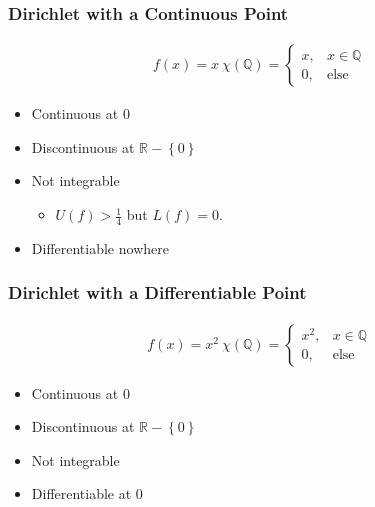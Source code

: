 \hypertarget{dirichlet-with-a-continuous-point}{%
\subsubsection{Dirichlet with a Continuous
Point}\label{dirichlet-with-a-continuous-point}}

\begin{align*}
f ( x ) = x~\chi({\mathbb{Q}}) = 
\begin{cases}
x, & x\in {\mathbb{Q}}\\
0, & \text{else}
\end{cases}
\end{align*}

\begin{itemize}
\tightlist
\item
  Continuous at 0
\item
  Discontinuous at \({\mathbb{R}}-\left\{{0}\right\}\)
\item
  Not integrable

  \begin{itemize}
  \tightlist
  \item
    \(U(f) > \frac 1 4\) but \(L(f) = 0\).
  \end{itemize}
\item
  Differentiable nowhere
\end{itemize}

\hypertarget{dirichlet-with-a-differentiable-point}{%
\subsubsection{Dirichlet with a Differentiable
Point}\label{dirichlet-with-a-differentiable-point}}

\begin{align*}
f ( x ) = x^2~\chi({\mathbb{Q}}) = \begin{cases}
x^2, & x\in {\mathbb{Q}}\\
0, & \text{else}
\end{cases}
\end{align*}

\begin{itemize}
\tightlist
\item
  Continuous at 0
\item
  Discontinuous at \({\mathbb{R}}-\left\{{0}\right\}\)
\item
  Not integrable
\item
  Differentiable at 0
\end{itemize}


